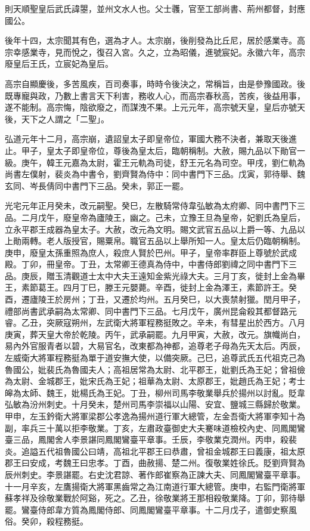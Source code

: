 
\begin{pinyinscope}

 則天順聖皇后武氏諱曌，並州文水人也。父士彠，官至工部尚書、荊州都督，封應國公。



 後年十四，太宗聞其有色，選為才人。太宗崩，後削發為比丘尼，居於感業寺。高宗幸感業寺，見而悅之，復召入宮。久之，立為昭儀，進號宸妃。永徽六年，高宗廢皇后王氏，立宸妃為皇后。



 高宗自顯慶後，多苦風疾，百司奏事，時時令後決之，常稱旨，由是參豫國政。後既專寵與政，乃數上書言天下利害，務收人心，而高宗春秋高，苦疾，後益用事，遂不能制。高宗悔，陰欲廢之，而謀洩不果。上元元年，高宗號天皇，皇后亦號天後，天下之人謂之「二聖」。



 弘道元年十二月，高宗崩，遺詔皇太子即皇帝位，軍國大務不決者，兼取天後進止。甲子，皇太子即皇帝位，尊後為皇太后，臨朝稱制。大赦，賜九品以下勛官一級。庚午，韓王元嘉為太尉，霍王元軌為司徒，舒王元名為司空。甲戌，劉仁軌為尚書左僕射，裴炎為中書令，劉齊賢為侍中：同中書門下三品。戊寅，郭待舉、魏玄同、岑長倩同中書門下三品。癸未，郭正一罷。



 光宅元年正月癸未，改元嗣聖。癸巳，左散騎常侍韋弘敏為太府卿、同中書門下三品。二月戊午，廢皇帝為廬陵王，幽之。己未，立豫王旦為皇帝，妃劉氏為皇后，立永平郡王成器為皇太子。大赦，改元為文明。賜文武官五品以上爵一等、九品以上勛兩轉。老人版授官，賜粟帛。職官五品以上舉所知一人。皇太后仍臨朝稱制。庚申，廢皇太孫重照為庶人，殺庶人賢於巴州。甲子，皇帝率群臣上尊號於武成殿。丁卯，冊皇帝。丁丑，太常卿王德真為侍中，中書侍郎劉禕之同中書門下三品。庚辰，贈玉清觀道士太中大夫王遠知金紫光祿大夫。三月丁亥，徙封上金為畢王，素節葛王。四月丁巳，滕王元嬰薨。辛酉，徙封上金為澤王，素節許王。癸酉，遷廬陵王於房州；丁丑，又遷於均州。五月癸巳，以大喪禁射獵。閏月甲子，禮部尚書武承嗣為太常卿、同中書門下三品。七月戊午，廣州昆侖殺其都督路元睿。乙丑，突厥寇朔州，左武衛大將軍程務挺敗之。辛未，有彗星出於西方。八月庚寅，葬天皇大帝於乾陵。丙午，武承嗣罷。九月甲寅，大赦，改元。旗幟尚白，易內外官服青者以碧，大易官名，改東都為神都，追尊老子母為先天太后。丙辰，左威衛大將軍程務挺為單于道安撫大使，以備突厥。己巳，追尊武氏五代祖克己為魯國公，妣裴氏為魯國夫人；高祖居常為太尉、北平郡王，妣劉氏為王妃；曾祖儉為太尉、金城郡王，妣宋氏為王妃；祖華為太尉、太原郡王，妣趙氏為王妃；考士皞為太師、魏王，妣楊氏為王妃。丁丑，柳州司馬李敬業舉兵於揚州以討亂。貶韋弘敏為汾州刺史。十月癸未，楚州司馬李崇福以山陽、安宜、鹽城三縣歸於敬業。甲申，左玉鈐衛大將軍梁郡公孝逸為揚州道行軍大總管，左金吾衛大將軍李知十為副，率兵三十萬以拒李敬業。丁亥，左肅政臺御史大夫騫味道檢校內史、同鳳閣鸞臺三品，鳳閣舍人李景諶同鳳閣鸞臺平章事。壬辰，李敬業克潤州。丙申，殺裴炎。追謚五代祖魯國公曰靖，高祖北平郡王曰恭肅，曾祖金城郡王曰義康，祖太原郡王曰安成，考魏王曰忠孝。丁酉，曲赦揚、楚二州。復敬業姓徐氏。貶劉齊賢為辰州刺史。李景諶罷。右史沈君諒、著作郎崔察為正諫大夫、同鳳閣鸞臺平章事。十一月辛亥，左鷹揚衛大將軍黑齒常之為江南道行軍大總管。庚申，右監門衛將軍蘇孝祥及徐敬業戰於阿谿，死之。乙丑，徐敬業將王那相殺敬業降。丁卯，郭待舉罷。鸞臺侍郎韋方質為鳳閣侍郎、同鳳閣鸞臺平章事。十二月戊子，遣御史察風俗。癸卯，殺程務挺。




\end{pinyinscope}
